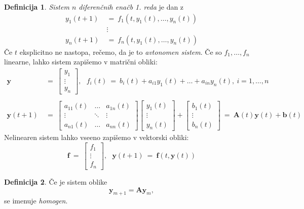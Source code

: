 \documentclass[11pt]{article}
\renewcommand{\b}{\mathbf{b}}
\newcommand{\f}{\mathbf{f}}
\newcommand{\y}{\mathbf{y}}
\newcommand{\A}{\mathbf{A}}
\newcommand{\0}{\mathbf{0}}
\theoremstyle{definition}
\newtheorem{definicija}{Definicija}[section]
\theoremstyle{definition}
\theoremstyle{definition}
\theoremstyle{definition}
\begin{document}
\begin{definicija}

\textit{Sistem $n$ diferenčnih enačb 1. reda} je dan z
\begin{align*}
y_1(t+1) ~&=~ f_1(t,y_1(t),\ldots,y_n(t)) \\
&\vdots \\
y_n(t+1) ~&=~ f_n(t,y_1(t),\ldots,y_n(t))
\end{align*} 
Če $t$ eksplicitno ne nastopa, rečemo, da je to \textit{avtonomen sistem}. Če so $f_1,\ldots,f_n$ linearne, lahko sistem zapišemo v matrični obliki:
\begin{align*}
\y ~&=~ \begin{bmatrix}
y_1 \\
\vdots \\
y_n
\end{bmatrix},~~~ f_i(t) ~=~ b_i(t) + a_{i1}y_1(t) + \ldots + a_{in}y_n(t), ~i = 1,\ldots, n\\ \\
\y(t+1) ~&=~ \begin{bmatrix}
a_{11}(t) & \ldots & a_{1n}(t) \\
\vdots & \ddots & \vdots \\
a_{n1}(t) & \ldots & a_{nn}(t)
\end{bmatrix} \begin{bmatrix}
y_1(t) \\
\vdots \\
y_n(t) 
\end{bmatrix} + \begin{bmatrix}
b_1(t) \\
\vdots \\
b_n(t)
\end{bmatrix} ~=~ \A(t)\y(t) + \b(t)
\end{align*}
Nelinearen sistem lahko vseeno zapišemo v vektorski obliki:
$$\f ~=~ \begin{bmatrix}
f_1 \\
\vdots \\
f_n
\end{bmatrix}, ~~~ \y(t+1) ~=~ \f(t, \y(t))$$

\end{definicija}
\vspace{0.5cm}

\begin{definicija}

Če je sistem oblike
$$\y_{m+1} = \A\y_m,$$
se imenuje \textit{homogen}.

\end{definicija}
\vspace{0.5cm}
\end{document}
